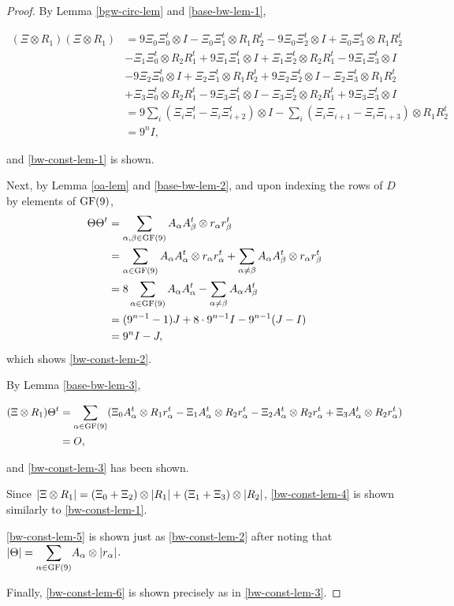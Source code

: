 \documentclass[../../../main]{subfiles}
\begin{document}
\begin{proof}
 By Lemma \ref{bgw-circ-lem} and \ref{base-bw-lem-1},
 \begin{small}
 \begin{align*}
  (\Xi \otimes R_1)(\Xi \otimes R_1) &= 9\Xi_0\Xi_0^t \otimes I - \Xi_0\Xi_1^t \otimes R_1R_2^t - 9\Xi_0\Xi_2^t \otimes I + \Xi_0\Xi_3^t \otimes R_1R_2^t \\
  &-\Xi_1\Xi_0^t \otimes R_2R_1^t + 9\Xi_1\Xi_1^t \otimes I + \Xi_1\Xi_2^t \otimes R_2R_1^t - 9\Xi_1\Xi_3^t \otimes I \\
  &-9\Xi_2\Xi_0^t \otimes I + \Xi_2\Xi_1^t \otimes R_1R_2^t + 9\Xi_2\Xi_2^t \otimes I - \Xi_2\Xi_3^t \otimes R_1R_2^t \\
  &+\Xi_3\Xi_0^t \otimes R_2R_1^t - 9\Xi_3\Xi_1^t \otimes I - \Xi_3\Xi_2^t \otimes R_2R_1^t + 9\Xi_3\Xi_3^t \otimes I \\
  &= 9\sum_i(\Xi_i\Xi_i^t - \Xi_i\Xi_{i+2}^t) \otimes I - \sum_i(\Xi_i\Xi_{i+1} - \Xi_i\Xi_{i+3}) \otimes R_1R_2^t \\
  &= 9^nI,
 \end{align*}
 \end{small}
 and \ref{bw-const-lem-1} is shown.
 
 Next, by Lemma \ref{oa-lem} and \ref{base-bw-lem-2}, and upon indexing the rows of $D$ by elements of $\text{GF}(9)$,
 \begin{align*}
  \Theta\Theta^t &= \sum_{\alpha,\beta \in \text{GF}(9)} A_\alpha A_\beta^t \otimes r_\alpha r_\beta^t \\
  &= \sum_{\alpha\in\text{GF}(9)} A_\alpha A_\alpha^t \otimes r_\alpha r_\alpha^t + \sum_{\alpha\neq\beta} A_\alpha A_\beta^t \otimes r_\alpha r_\beta^t \\
  &= 8\sum_{\alpha\in\text{GF}(9)} A_\alpha A_\alpha^t - \sum_{\alpha\neq\beta} A_\alpha A_\beta^t \\
  &= (9^{n-1}-1)J + 8 \cdot 9^{n-1}I - 9^{n-1}(J-I) \\
  &= 9^nI - J,
 \end{align*}
 which shows \ref{bw-const-lem-2}.
 
 By Lemma \ref{base-bw-lem-3},
 \begin{small}
 \begin{align*}
  (\Xi \otimes R_1)\Theta^t &= \sum_{\alpha\in\text{GF}(9)}(\Xi_0A_\alpha^t \otimes R_1r_\alpha^t - \Xi_1A_\alpha^t \otimes R_2r_\alpha^t - \Xi_2A_\alpha^t \otimes R_2r_\alpha^t + \Xi_3A_\alpha^t \otimes R_2r_\alpha^t) \\
  &= O,
 \end{align*}
 \end{small}
 and \ref{bw-const-lem-3} has been shown.
 
 Since $|\Xi \otimes R_1| = (\Xi_0 + \Xi_2) \otimes |R_1| + (\Xi_1 + \Xi_3) \otimes |R_2|$, \ref{bw-const-lem-4} is shown similarly to \ref{bw-const-lem-1}.
 
 \ref{bw-const-lem-5} is shown just as \ref{bw-const-lem-2} after noting that $\abs{\Theta}=\ssum_{\alpha\in\gf(9)}A_\alpha \otimes \abs{r_\alpha}$.
 
 Finally, \ref{bw-const-lem-6} is shown precisely as in \ref{bw-const-lem-3}.
\end{proof}
\end{document}
